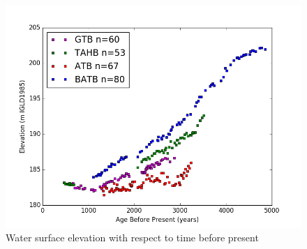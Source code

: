 \begin{figure}[h]
	\includegraphics[width=\linewidth]{data/theDataRaw.png}
	\caption{Water surface elevation with respect to time before present}
	\label{fig:rawData}
\end{figure} 
%
